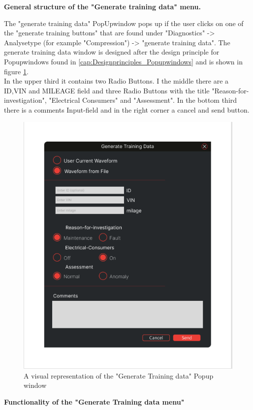 \documentclass{scrreprt}
\begin{document}
\textbf{General structure of the "Generate training data" menu.} 

The "generate training data" PopUpwindow pops up if the user clicks on one of the "generate training buttons" that are found under "Diagnostics" -> Analysetype (for example "Compression") -> "generate training data". The generate training data window is designed after the design principle for Popupwindows found in \ref{cap:Designprinciples_Popupwindows} and is shown in figure \ref{fig: Generate Training data Popupwindow}.\\  In the upper third it contains two Radio Buttons. I the middle there are a ID,VIN and MILEAGE field and three Radio Buttons with the title "Reason-for-investigation", "Electrical Consumers" and "Assessment". In the bottom third there is a comments Input-field and in the right corner a cancel and send button. 

\begin{figure}
    \includegraphics[width=.9\textwidth]{assets/pictures/GenerateTrainingDataMenu.png}
    \caption[]{A visual representation of the "Generate Training data" Popup window}
    \label{fig: Generate Training data Popupwindow}
\end{figure}

\textbf{Functionality of the "Generate Training data menu"}
\end{document}
